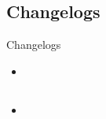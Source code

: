 \subsection{Changelogs}
\begin{frame}[fragile]{Changelogs}
  \begin{itemize}
    \item 
  \end{itemize}
\end{frame}


\subsection{\rtd}
\begin{frame}[fragile]{\rtd}
  \begin{itemize}
    \item 
  \end{itemize}
\end{frame}
